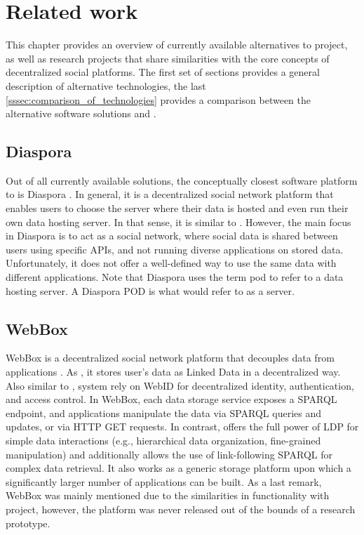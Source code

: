 \chapter{Related work}
\label{chap:num_2}

This chapter provides an overview of currently available alternatives to \solid{} project, as well as research projects that share similarities with the core concepts of decentralized social platforms. The first set of sections provides a general description of alternative technologies, the last \autoref{sssec:comparison_of_technologies} provides a comparison between the alternative software solutions and \solid{}.

\section{Diaspora}

Out of all currently available solutions, the conceptually closest software platform to \solid{} is Diaspora \cite{diaspora_paper}\cite{diaspora_site}. In general, it is a decentralized social network platform that enables users to choose the server where their data is hosted and even run their own data hosting server. In that sense, it is similar to \solid{}. However, the main focus in Diaspora is to act as a social network, where social data is shared between users using specific APIs, and not running diverse applications on stored data. Unfortunately, it does not offer a well-defined way to use the same data with different applications. Note that Diaspora uses the term pod to refer to a data hosting server. A Diaspora POD is what \solid{} would refer to as a \solid{} server.

\section{WebBox}

WebBox is a decentralized social network platform that decouples data from applications \cite{webbox}. As \solid{}, it stores user’s data as Linked Data in a decentralized way. Also similar to \solid{}, system rely on WebID for decentralized identity, authentication, and access control. In WebBox, each data storage service exposes a SPARQL endpoint, and applications manipulate the data via SPARQL queries and updates, or via HTTP GET requests. In contrast, \solid{} offers the full power of LDP for simple data interactions (e.g., hierarchical data organization, fine-grained manipulation) and additionally allows the use of link-following SPARQL for complex data retrieval. It also works as a generic storage platform upon which a significantly larger number of applications can be built. As a last remark, WebBox was mainly mentioned due to the similarities in functionality with \solid{} project, however, the platform was never released out of the bounds of a research prototype.

